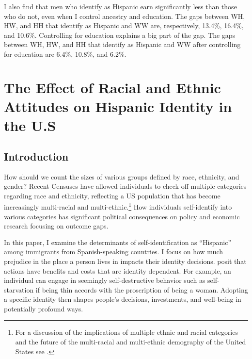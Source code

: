 \documentclass[12pt, fullpage]{article}
\begin{document}
I also find that men who identify as Hispanic earn significantly less than those who do not, even when I control ancestry and education. The gaps between WH, HW, and HH that identify as Hispanic and WW are, respectively, 13.4\%, 16.4\%, and 10.6\%. Controlling for education explains a big part of the gap. The gaps between WH, HW, and HH that identify as Hispanic and WW after controlling for education are 6.4\%, 10.8\%, and 6.2\%. 

\pagebreak
\newpage

\section[\bf \uppercase{The Effect of Racial and Ethnic Attitudes on Hispanic Identity in the U.S}]{The Effect of Racial and Ethnic Attitudes on Hispanic Identity in the U.S}

\subsection{Introduction}\label{sec:intro}
 
How should we count the sizes of various groups defined by race, ethnicity, and gender? Recent Censuses have allowed individuals to check off multiple categories regarding race and ethnicity, reflecting a US population that has become increasingly multi-racial and multi-ethnic.\footnote{For a discussion of the implications of multiple ethnic and racial categories and the future of the multi-racial and multi-ethnic demography of the United States see \citet{bratterMultiracialIdentificationRacial2018,albaGreatDemographicIllusion2020}.} How individuals self-identify into various categories has significant political consequences on policy and economic research focusing on outcome gaps.

In this paper, I examine the determinants of self-identification as ``Hispanic'' among immigrants from Spanish-speaking countries. I focus on how much prejudice in the place a person lives in impacts their identity decisions.  \citet{akerlofEconomicsIdentity2000} posit that actions have benefits and costs that are identity dependent. For example, an individual can engage in seemingly self-destructive behavior such as self-starvation if being thin accords with the proscription of being a woman. Adopting a specific identity then shapes people's decisions, investments, and well-being in potentially profound ways. 
\end{document}
